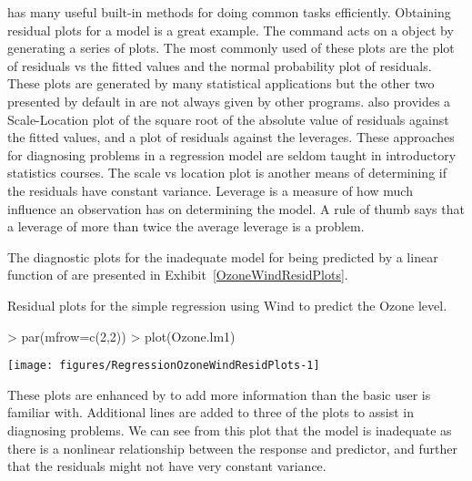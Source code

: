\R{} has many useful built-in methods for doing common tasks efficiently. Obtaining residual plots for a model is a great example. The  command acts on a  object by generating a series of plots. The most commonly used of these plots are the plot of residuals vs the fitted values and the normal probability plot of residuals. These plots are generated by many statistical applications but the other two presented by default in \R{} are not always given by other programs. 
\R{} also provides a Scale-Location plot of the square root of the absolute value of residuals against the fitted values, and a plot of residuals against the leverages. These approaches for diagnosing problems in a regression model are seldom taught in introductory statistics courses.  
The scale vs location plot is another means of determining if the residuals have constant variance. Leverage is a measure of how much influence an observation has on determining the model. A rule of thumb says that a leverage of more than twice the average leverage is a problem. 
 
The diagnostic plots for the inadequate model for  being predicted by a linear function of  are presented in Exhibit~\ref{OzoneWindResidPlots}. 
\begin{exhibit} 
\begin{center} 
\caption{Residual plots for the simple regression using Wind to predict the Ozone level.} 
\label{OzoneWindResidPlots} 
\begin{Schunk}
\begin{Sinput}
> par(mfrow=c(2,2)) 
> plot(Ozone.lm1) 
\end{Sinput}

\texttt{[image: figures/RegressionOzoneWindResidPlots-1]} \end{Schunk}
\end{center} 
\end{exhibit} 
These plots are enhanced by \R{} to add more information than the basic user is familiar with. Additional lines are added to three of the plots to assist in diagnosing problems. We can see from this plot that the model is inadequate as there is a nonlinear relationship between the response and predictor, and further that the residuals might not have very constant variance. 
 

